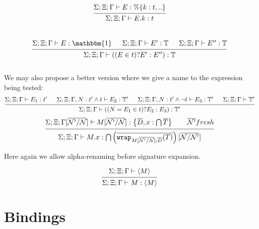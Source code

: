 \documentclass[12pt]{article}
\newcommand{\Next}{\ensuremath{\mathcal{N}}}
\newcommand{\Gammatop}{\ensuremath{\Xi}}
\newcommand{\Gammabot}{\ensuremath{\Gamma}}
\newcommand{\toptype}{\mathbbm{1}}
\newcommand{\wrap}{\texttt{wrap}}
\begin{document}
\[
    \begin{prooftree}
        \hypo { \Sigma; \Gammatop; \Gammabot \vdash E : \%\{ k : t, .. \}  }
        \infer1{ \Sigma; \Gammatop; \Gammabot \vdash E.k : t }
    \end{prooftree}
\] \\

\[
    \begin{prooftree}
        \hypo { \Sigma; \Gammatop; \Gammabot \vdash E : \toptype }
        \hypo { \Sigma; \Gammatop; \Gammabot \vdash E' : \mathbb{T} }
        \hypo { \Sigma; \Gammatop; \Gammabot \vdash E'' : \mathbb{T} }
        \infer3{ \Sigma; \Gammatop; \Gammabot \vdash \left((E \in t) ? E' : E''\right) : \mathbb{T} }
    \end{prooftree}
\] \\

We may also propose a better version where we give a name to the expression being tested:
\[
    \begin{prooftree}
        \hypo { \Sigma; \Gammatop; \Gammabot \vdash E_1 : t'}
        \hypo { \Sigma; \Gammatop; \Gammabot, N : t' \wedge t \vdash E_2 : \mathbb{T}' }
        \hypo { \Sigma; \Gammatop; \Gammabot, N : t' \wedge \lnot t \vdash E_3 : \mathbb{T}'  }
        \hypo { \Sigma; \Gammatop; \Gammabot \vdash \mathbb{T}'  }
        \infer4{ \Sigma; \Gammatop; \Gammabot \vdash \left((N = E_1 \in t) ? E_2 : E_3\right) : \mathbb{T}' }
    \end{prooftree}
\]
\[
    \begin{prooftree}
        \hypo { \Sigma; \Gammatop; \Gammabot[\overline{\Next'/\Next}] \vdash M[\overline{\Next'/\Next}] : \left\{ \overline{D}, x : \bigcap \overline{T} \right\} \qquad \overline{\Next'} fresh}
        \infer1{ \Sigma; \Gammatop; \Gammabot \vdash M.x : \bigcap \left(\overline{\wrap_{M[\overline{\Next'/\Next}]; \overline{D}}(T)}\right)[\overline{\Next/\Next'}]}
    \end{prooftree}
\]

Here again we allow alpha-renaming before signature expansion.

\[
    \begin{prooftree}
        \hypo { \Sigma; \Gammatop; \Gammabot \vdash \langle M \rangle }
        \infer1{ \Sigma; \Gammatop; \Gammabot \vdash M : \langle M \rangle }
    \end{prooftree}
\]

\section{Bindings}
\end{document}
